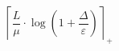 \[\left\lceil \frac{L}{\mu} \cdot \log\left(1 + \frac{\Delta}{\varepsilon}\right) \right\rceil_{+}\]
